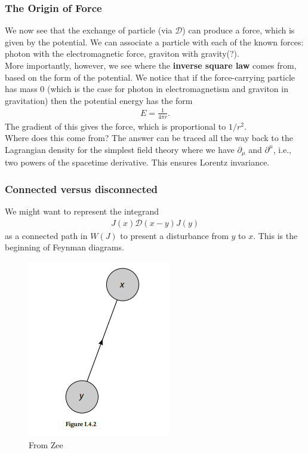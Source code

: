 \documentclass{book}
\theoremstyle{definition}
\newcommand{\p}{\partial}
\newcommand{\f}[2]{\frac{#1}{#2}}
\newcommand{\D}{\mathcal{D}}
\begin{document}
\subsubsection{The Origin of Force}

We now see that the exchange of particle (via $\D$) can produce a force, which is given by the potential. We can associate a particle with each of the known forces: photon with the electromagnetic force, graviton with gravity(?). \\

More importantly, however, we see where the \textbf{inverse square law} comes from, based on the form of the potential. We notice that if the force-carrying particle has mass 0 (which is the case for photon in electromagnetism and graviton in gravitation) then the potential energy has the form
\begin{align}
E = \f{1}{4\pi r}.
\end{align}
The gradient of this gives the force, which is proportional to $1/r^2$. \\

Where does this come from? The answer can be traced all the way back to the Lagrangian density for the simplest field theory where we have $\p_\mu$ and $\p^\mu$, i.e., two powers of the spacetime derivative. This ensures Lorentz invariance. 












\subsubsection{Connected versus disconnected}

We might want to represent the integrand
\begin{align}
J(x)\D(x-y)J(y)
\end{align}
as a connected path in $W(J)$ to present a disturbance from $y$ to $x$. This is the beginning of Feynman diagrams. 
\begin{figure}[!htb]
	\centering
	\includegraphics[scale=0.7]{feynman-1}
	\caption{From Zee}
\end{figure}
\end{document}
